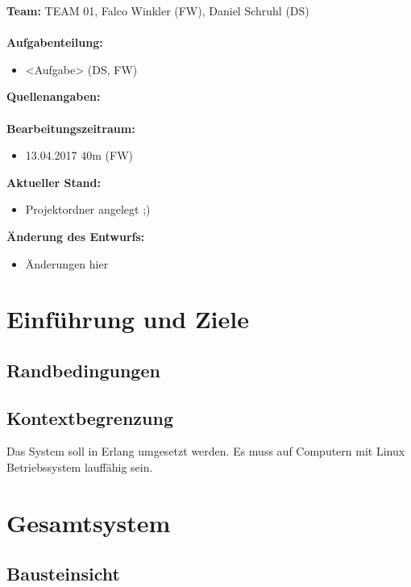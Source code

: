 \documentclass{article}
\begin{document}
\textbf{Team:} TEAM 01, Falco Winkler (FW), Daniel Schruhl (DS)\\
\\
\textbf{Aufgabenteilung:}
\begin{itemize}
    \item <Aufgabe> (DS, FW)
\end{itemize}

\textbf{Quellenangaben:}\\
\\
\textbf{Bearbeitungszeitraum:}
\begin{itemize}
	\item 13.04.2017 40m (FW)
\end{itemize}

\textbf{Aktueller Stand:}
\begin{itemize}
	\item Projektordner angelegt ;)
\end{itemize}

\textbf{Änderung des Entwurfs:}
\begin{itemize}
    \item Änderungen hier
\end{itemize}

\newpage

\section{Einführung und Ziele}

\subsection{Randbedingungen}

\subsection{Kontextbegrenzung}
Das System soll in Erlang umgesetzt werden. Es muss auf Computern mit Linux Betriebssystem lauffähig sein.

\newpage

\section{Gesamtsystem}

\subsection{Bausteinsicht}
\end{document}
